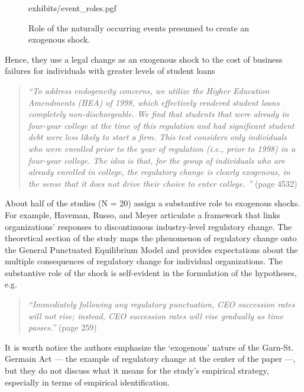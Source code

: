 \documentclass[11pt]{article}
\begin{document}
\begin{refsection}
\begin{figure}[!htbp]
    \centering
    {exhibits/event_roles.pgf}
    \caption{Role of the naturally occurring events presumed to create
    an exogenous shock.}
    \label{fig:event_roles}
\end{figure}

Hence, they use a legal change as an exogenous shock to the cost of business failures for individuals with greater levels of student loans

\begin{quote}
  \textit{
  ``To address endogeneity concerns, we utilize the Higher Education Amendments
  (HEA) of 1998, which effectively rendered student loans completely
  non-dischargeable. We find that students that were already in four-year
  college at the time of this regulation and had significant student debt were
  less likely to start a firm. This test considers only individuals who were
  enrolled prior to the year of regulation (i.e., prior to 1998) in a four-year
  college.  The idea is that, for the group of individuals who are already
  enrolled in college, the regulatory change is clearly exogenous, in the sense
  that it does not drive their choice to enter college. ''
  }
  (page 4532)
\end{quote}

About half of the studies (N = 20) assign a substantive role to exogenous shocks.  For example, Haveman, Russo, and Meyer \autocite*{haveman2001253}  articulate a framework that links organizations' responses to discontinuous industry-level regulatory change. The theoretical section of the study maps the phenomenon of regulatory change onto the General Punctuated Equilibrium Model and provides expectations about the multiple consequences of regulatory change for individual organizations. The substantive role of the shock is self-evident in the formulation of the hypotheses, e.g.

\begin{quote}
  \textit{
    ``Immediately following any regulatory punctuation, CEO succession rates
    will not rise; instead, CEO succession rates will rise gradually as time
    passes.''
  }
  (page 259)
\end{quote}

It is worth notice the authors emphasize the `exogenous' nature of the Garn-St. Germain Act --- the example of regulatory change at the center of the paper  ---, but they do not discuss what it means for the study's empirical strategy,  especially in terms of empirical identification.


\end{refsection}
\end{document}
